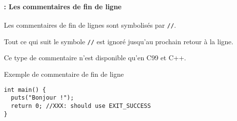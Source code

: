 \begin{frame}[containsverbatim]
  \frametitle{\secname}
  \framesubtitle{\subsecname : Les commentaires de fin de ligne}
 
  Les commentaires de fin de lignes sont symbolisés par \verb|//|. 
  \par
  Tout ce qui suit le symbole \verb|//| est ignoré jusqu'au prochain retour à la ligne.
  \par
  Ce type de commentaire n'est disponible qu'en C99 et C++.
  \begin{exampleblock}{Exemple de commentaire de fin de ligne}
    \small\begin{verbatim}
int main() {
  puts("Bonjour !");
  return 0; //XXX: should use EXIT_SUCCESS
}\end{verbatim}
  \end{exampleblock}
\end{frame}

